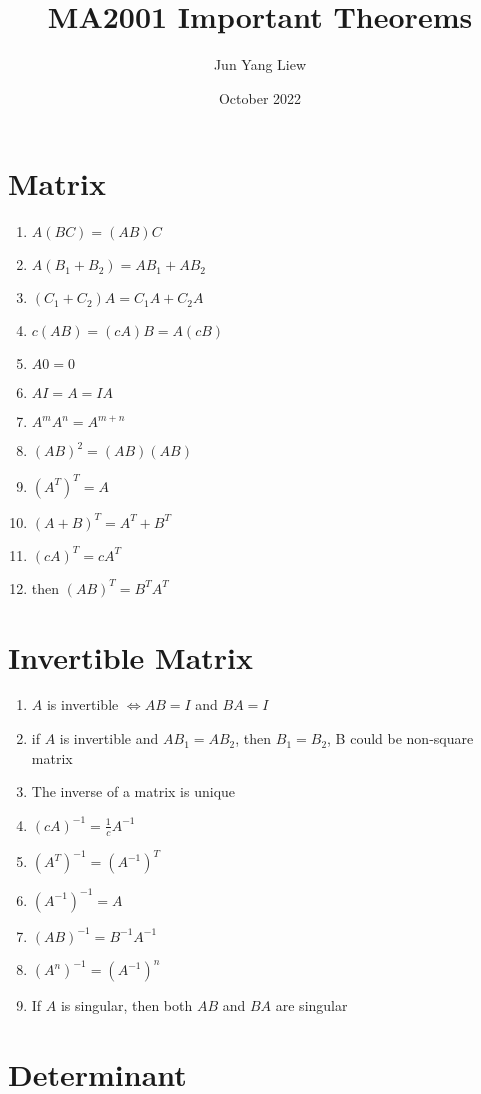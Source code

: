 \documentclass{article}
\title{MA2001 Important Theorems}
\author{Jun Yang Liew}
\date{October 2022}
\begin{document}
\maketitle

\section*{Matrix}

\begin{enumerate}
\item \(A(BC) = (AB)C\)
\item \(A(B_1 + B_2) = AB_1 + AB_2\)
\item \((C_1 + C_2)A = C_1A + C_2A\)
\item \(c(AB) = (cA)B = A(cB)\)
\item \(A0 = 0\)
\item \(AI = A = IA\)
\item \(A^mA^n = A^{m+n}\)
\item \((AB)^2 = (AB)(AB)\)
\item \((A^T)^T = A\) 
\item \((A+B)^T = A^T + B^T\) 
\item \((cA)^T = cA^T\) 
\item then \((AB)^T = B^TA^T\)
\end{enumerate}

\section*{Invertible Matrix}

\begin{enumerate}
\item \(A\) is invertible \(\Leftrightarrow AB = I \) and \(BA = I\)
\item if \(A\) is invertible and \(AB_1 = AB_2\), then \(B_1 = B_2\), B could be non-square matrix
\item The inverse of a matrix is unique
\item \((cA)^{-1} = \frac{1}{c} A^{-1}\)
\item \((A^T)^{-1} = (A^{-1})^T\)
\item \((A^{-1})^{-1} = A\)
\item \((AB)^{-1} = B^{-1}A^{-1}\)
\item \((A^n)^{-1} = (A^{-1})^n\)
\item If \(A\) is singular, then both \(AB\) and \(BA\) are singular
\end{enumerate}

\section*{Determinant}
\end{document}
